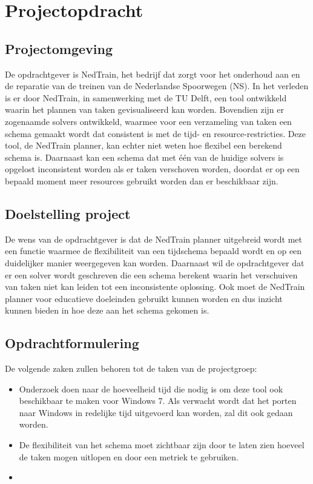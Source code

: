 \section{Projectopdracht}
\subsection{Projectomgeving}
De opdrachtgever is NedTrain, het bedrijf dat zorgt voor het onderhoud aan en de reparatie van de treinen van de Nederlandse Spoorwegen (NS). In het verleden is er door NedTrain, in samenwerking met de TU Delft, een tool ontwikkeld waarin het plannen van taken gevisualiseerd kan worden. Bovendien zijn er zogenaamde solvers ontwikkeld, waarmee voor een verzameling van taken een schema gemaakt wordt dat consistent is met de tijd- en resource-restricties. Deze tool, de NedTrain planner, kan echter niet weten hoe flexibel een berekend schema is. Daarnaast kan een schema dat met \'e\'en van de huidige solvers is opgelost inconsistent worden als er taken verschoven worden, doordat er op een bepaald moment meer resources gebruikt worden dan er beschikbaar zijn.

\subsection{Doelstelling project}
De wens van de opdrachtgever is dat de NedTrain planner uitgebreid wordt met een functie waarmee de flexibiliteit van een tijdschema bepaald wordt en op een duidelijker manier weergegeven kan worden. Daarnaast wil de opdrachtgever dat er een solver wordt geschreven die een schema berekent waarin het verschuiven van taken niet kan leiden tot een inconsistente oplossing. Ook moet de NedTrain planner voor educatieve doeleinden gebruikt kunnen worden en dus inzicht kunnen bieden in hoe deze aan het schema gekomen is.




\subsection{Opdrachtformulering}
De volgende zaken zullen behoren tot de taken van de projectgroep:
\begin{itemize}
	\item Onderzoek doen naar de hoeveelheid tijd die nodig is om deze tool ook beschikbaar te maken voor Windows 7. Als verwacht wordt dat het porten naar Windows in redelijke tijd uitgevoerd kan worden, zal dit ook gedaan worden. 
	\item De flexibiliteit van het schema moet zichtbaar zijn door te laten zien hoeveel de taken mogen uitlopen en door een metriek te gebruiken.
	\item 
\end{itemize}

